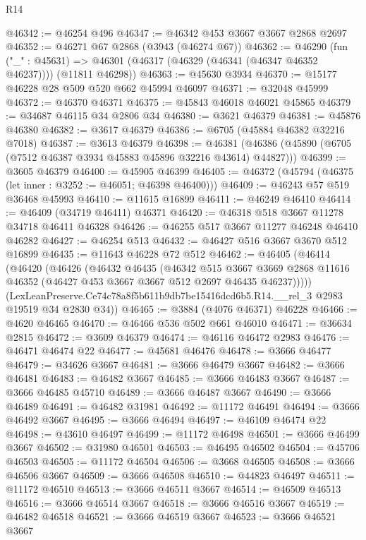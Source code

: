 \begin{lexlean}{R14}
\begin{coremodule}
@46342 := @46254 @496
@46347 := @46342 @453 @3667 @3667 @2868 @2697
@46352 := @46271 @67 @2868 (@3943 (@46274 @67))
@46362 := @46290
    (fun ("_" : @45631) => @46301 (@46317 (@46329 (@46341 (@46347 @46352 @46237)))) (@11811 @46298))
@46363 := @45630 @3934
@46370 := @15177 @46228 @28 @509 @520 @662 @45994 @46097
@46371 := @32048 @45999
@46372 := @46370 @46371
@46375 := @45843 @46018 @46021 @45865
@46379 := @34687 @46115 @34 @2806 @34
@46380 := @3621 @46379
@46381 := @45876 @46380
@46382 := @3617 @46379
@46386 := @6705 (@45884 @46382 @32216 @7018)
@46387 := @3613 @46379
@46398 := @46381 (@46386 (@45890 (@6705 (@7512 @46387 @3934 @45883 @45896 @32216 @43614) @44827)))
@46399 := @3605 @46379
@46400 := @45905 @46399
@46405 := @46372 (@45794 (@46375 (let inner : @3252 := @46051; @46398 @46400)))
@46409 := @46243 @57 @519 @36468 @45993
@46410 := @11615 @16899
@46411 := @46249 @46410
@46414 := @46409 (@34719 @46411) @46371
@46420 := @46318 @518 @3667 @11278 @34718 @46411 @46328
@46426 := @46255 @517 @3667 @11277 @46248 @46410 @46282
@46427 := @46254 @513
@46432 := @46427 @516 @3667 @3670 @512 @16899
@46435 := @11643 @46228 @72 @512
@46462 := @46405
    (@46414
      (@46420
        (@46426
          (@46432
            @46435
            (@46342
              @515
              @3667
              @3669
              @2868
              @11616
              @46352
              (@46427 @453 @3667 @3667 @512 @2697 @46435 @46237)))))
      (LexLeanPreserve.Ce74c78a8f5b611b9db7be15416dcd6b5.R14.__rel_3 @2983 @19519 @34 @2830 @34))
@46465 := @3884 (@4076 @46371) @46228
@46466 := @4620 @46465
@46470 := @46466 @536 @502 @661 @46010
@46471 := @36634 @2815
@46472 := @3609 @46379
@46474 := @46116 @46472 @2983
@46476 := @46471 @46474 @22
@46477 := @45681 @46476
@46478 := @3666 @46477
@46479 := @34626 @3667
@46481 := @3666 @46479 @3667
@46482 := @3666 @46481
@46483 := @46482 @3667
@46485 := @3666 @46483 @3667
@46487 := @3666 @46485 @45710
@46489 := @3666 @46487 @3667
@46490 := @3666 @46489
@46491 := @46482 @31981
@46492 := @11172 @46491
@46494 := @3666 @46492 @3667
@46495 := @3666 @46494
@46497 := @46109 @46474 @22
@46498 := @43610 @46497
@46499 := @11172 @46498
@46501 := @3666 @46499 @3667
@46502 := @31980 @46501
@46503 := @46495 @46502
@46504 := @45706 @46503
@46505 := @11172 @46504
@46506 := @3668 @46505
@46508 := @3666 @46506 @3667
@46509 := @3666 @46508
@46510 := @44823 @46497
@46511 := @11172 @46510
@46513 := @3666 @46511 @3667
@46514 := @46509 @46513
@46516 := @3666 @46514 @3667
@46518 := @3666 @46516 @3667
@46519 := @46482 @46518
@46521 := @3666 @46519 @3667
@46523 := @3666 @46521 @3667

\end{coremodule}
\end{lexlean}
